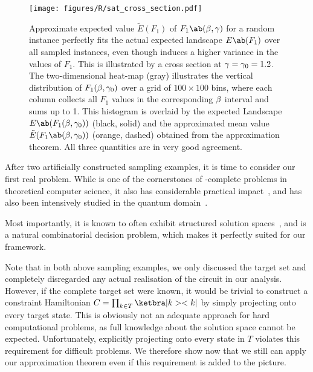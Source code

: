 \begin{figure}[htbp] \texttt{[image: figures/R/sat\_cross\_section.pdf]}\vspace*{-1em}
    \caption{Approximate expected value $\tilde{E}(F_1)$ of $F_1\ab(\mangle, \pangle)$ for a random \SAT instance perfectly fits the actual expected landscape $E\ab(F_1)$ over all sampled instances, even though \SAT induces a higher variance in the values of $F_1$. This is illustrated by a cross section at $\gamma = \gamma_{0} = 1.2$. 
    The two-dimensional heat-map  (gray) illustrates the vertical distribution of $F_1(\beta, \gamma_0)$ over a grid of $100 \times 100$ bins, where each column collects all $F_1$ values in the corresponding $\beta$ interval and sums up to 1. This histogram is overlaid by the expected Landscape $E\ab(F_1(\mangle, \pangle_{0}))$  (black, solid) and the approximated mean value $\tilde{E}(F_1\ab(\mangle, \pangle_{0}))$  (orange, dashed) obtained from the approximation theorem. All three quantities are in very good agreement.}
    \label{fig:sat_cross_section}
\end{figure}

After two artificially constructed sampling examples, it is time to consider our first real problem. While \SAT is one of
the cornerstones of \NP-complete problems in theoretical computer science, it also has considerable practical impact~\cite{Ganesh:2020},
and has also been intensively studied in the 
quantum 
domain~\cite{Gabor:2019,Sax:2020,Krueger:2020,Willsch:2022,Zielinski:2023}.

Most importantly, it is known to often exhibit structured solution spaces~\cite{achlioptas2011solution}, and is a natural combinatorial decision problem, which makes it perfectly suited for our framework. 

Note that in both above sampling examples, we only discussed the target set and completely disregarded any actual realisation of the \QAOA circuit in our analysis. However, if the complete target set were known, it would be trivial to construct a constraint Hamiltonian $C = \prod_{k \in T} \ketbra|k><k|$ by simply projecting onto every target state. This is obviously not an adequate approach for hard computational problems, as full knowledge about the solution space cannot be expected.
Unfortunately, explicitly projecting onto every state in $T$ violates this requirement for difficult problems. We therefore show now that we still can apply our approximation theorem even if this requirement is added to the picture.

